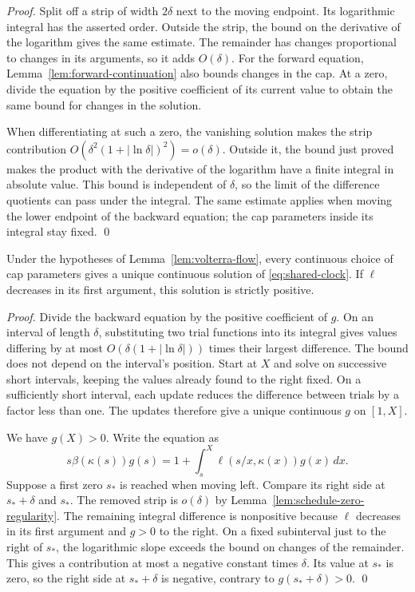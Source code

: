 \documentclass[runningheads,envcountsame,envcountsect,orivec]{llncs}
\begin{document}
\begin{proof}
Split off a strip of width $2\delta$ next to the moving
endpoint. Its logarithmic integral has the asserted order.
Outside the strip, the bound on the derivative of the logarithm
gives the same estimate. The remainder has changes proportional
to changes in its arguments, so it adds $O(\delta)$.
For the forward equation, Lemma~\ref{lem:forward-continuation}
also bounds changes in the cap. At a zero, divide the equation
by the positive coefficient of its current value to obtain
the same bound for changes in the solution.

When differentiating at such a zero, the vanishing solution
makes the strip contribution
$O(\delta^2(1+|\ln\delta|)^2)=o(\delta)$.
Outside it, the bound just proved makes the product with the
derivative of the logarithm have a finite integral in absolute
value. This bound is independent of $\delta$, so the limit of
the difference quotients can pass under the integral.
The same estimate applies when moving the lower endpoint of the
backward equation; the cap parameters inside its integral stay fixed.
\qed
\end{proof}

\begin{lemma}
\label{lem:backward-positive}
Under the hypotheses of Lemma~\ref{lem:volterra-flow},
every continuous choice of cap parameters gives a unique continuous
solution of \eqref{eq:shared-clock}.
If $\ell$ decreases in its first argument, this solution
is strictly positive.
\end{lemma}

\begin{proof}
Divide the backward equation by the positive coefficient of $g$.
On an interval of length $\delta$, substituting two trial
functions into its integral gives values differing by at most
$O(\delta(1+|\ln\delta|))$ times their largest
difference. The bound does not depend on the interval's position.
Start at $X$ and solve on successive short intervals, keeping
the values already found to the right fixed. On a sufficiently
short interval, each update reduces the difference between
trials by a factor less than one. The updates therefore give
a unique continuous $g$ on $[1,X]$.

We have $g(X)>0$. Write the equation as
\[
 s\beta(\kappa(s))g(s)
 =1+\int_s^X\ell(s/x,\kappa(x))g(x)\,dx.
\]
Suppose a first zero $s_*$ is reached when moving left.
Compare its right side at $s_*+\delta$ and $s_*$.
The removed strip is $o(\delta)$ by
Lemma~\ref{lem:schedule-zero-regularity}.
The remaining integral difference is nonpositive because
$\ell$ decreases in its first argument and $g>0$ to the
right. On a fixed subinterval just to the right of $s_*$,
the logarithmic slope exceeds the bound on changes of the
remainder. This gives a contribution at most a negative
constant times $\delta$. Its value at $s_*$ is zero, so the right side
at $s_*+\delta$ is negative, contrary to $g(s_*+\delta)>0$.
\qed
\end{proof}
\end{document}
